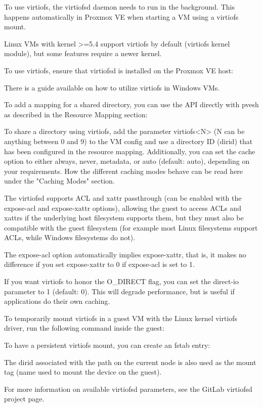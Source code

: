 To use virtiofs, the virtiofsd daemon needs to run in the background. This happens automatically in Proxmox VE when starting a VM using a virtiofs mount.

Linux VMs with kernel >=5.4 support virtiofs by default (virtiofs kernel module), but some features require a newer kernel.

To use virtiofs, ensure that virtiofsd is installed on the Proxmox VE host:

There is a guide available on how to utilize virtiofs in Windows VMs.

To add a mapping for a shared directory, you can use the API directly with pvesh as described in the Resource Mapping section:

To share a directory using virtiofs, add the parameter virtiofs<N> (N can be anything between 0 and 9) to the VM config and use a directory ID (dirid) that has been configured in the resource mapping. Additionally, you can set the cache option to either always, never, metadata, or auto (default: auto), depending on your requirements. How the different caching modes behave can be read here under the "Caching Modes" section.

The virtiofsd supports ACL and xattr passthrough (can be enabled with the expose-acl and expose-xattr options), allowing the guest to access ACLs and xattrs if the underlying host filesystem supports them, but they must also be compatible with the guest filesystem (for example most Linux filesystems support ACLs, while Windows filesystems do not).

The expose-acl option automatically implies expose-xattr, that is, it makes no difference if you set expose-xattr to 0 if expose-acl is set to 1.

If you want virtiofs to honor the O_DIRECT flag, you can set the direct-io parameter to 1 (default: 0). This will degrade performance, but is useful if applications do their own caching.

To temporarily mount virtiofs in a guest VM with the Linux kernel virtiofs driver, run the following command inside the guest:

To have a persistent virtiofs mount, you can create an fstab entry:

The dirid associated with the path on the current node is also used as the mount tag (name used to mount the device on the guest).

For more information on available virtiofsd parameters, see the GitLab virtiofsd project page.


